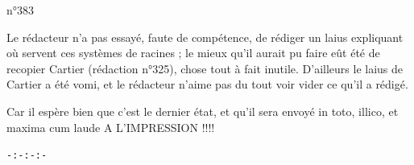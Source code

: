 \hfill n°383

Le rédacteur n'a pas essayé, faute de compétence, de rédiger un laius expliquant où servent ces systèmes de racines ; le mieux qu'il aurait pu faire eût été de recopier Cartier (rédaction n°325), chose tout à fait inutile. D'ailleurs le laius de Cartier a été vomi, et le rédacteur n'aime pas du tout voir vider ce qu'il a rédigé.

Car il espère bien que c'est le dernier état, et qu'il sera envoyé in toto, illico, et maxima cum laude A L'IMPRESSION !!!!

\begin{center}\texttt{-:-:-:-}\end{center}
